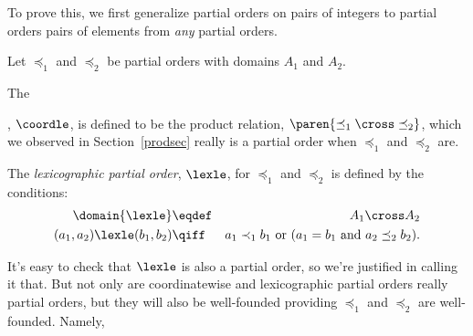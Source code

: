 \iffalse

But why stop at $n$ when we can be much more general without being any more
complicated?

The idea is that a Cartesion product, $A_1 \cross A_2 \cross \dots \cross
A_n$ of sets $A_1,A_2, \dots, A_n$ consists of all the $n$-tuples
$\ang{a_1,a_2,\dots,a_n}$ such that $a_i \in A_i$ for $1 \le i \le n$.  But
any such $n$-tuple can be represented by the function, $f$, where $f(i)
\eqdef a_i$.

GO ON TO DEFINE: a \emph{dependent-type} is a set-valued total function.
For example, for $r \in \reals$, define the dependent-type, $F_0$, by the
rule:
\[
F_0(r) \eqdef\ \ \set{t \in \reals \suchthat t \neq r}.
\]

If $F$ is a dependent-type, then an \emph{element of type, $F$,} is
defined to be a total function, $f$, with the same domain as $F$, and such
that
\[
\forall a \in \domain(F)\ f(a) \in F(a).
\]

AND SO ON...
\fi

To prove this, we first generalize partial orders on pairs of integers
to partial orders pairs of elements from \emph{any} partial orders.

\begin{definition}\label{lex-coord-def}
Let $\preceq_1$ and $\preceq_2$ be partial orders with domains $A_1$
and $A_2$.

The , $\coordle$, is defined to be the product relation,
$\paren{\preceq_1 \cross \preceq_2}$, which we observed in
Section~\ref{prodsec} really is a partial order when $\preceq_1$ and
$\preceq_2$ are.

The \emph{lexicographic partial order}, $\lexle$, for $\preceq_1$ and
$\preceq_2$ is defined by the conditions:
\begin{eqnarray*}
\domain{\lexle} &\eqdef& A_1 \cross A_2\\
(a_1,a_2) \lexle (b_1,b_2) & \qiff & a_1 \prec_1 b_1\text{ or } (a_1=b_1 \text{
and } a_2 \preceq_2 b_2).
\end{eqnarray*}

\end{definition}

It's easy to check that $\lexle$ is also a partial order, so we're
justified in calling it that.  But not only are coordinatewise and
lexicographic partial orders really partial orders, but they will also be
well-founded providing $\preceq_1$ and $\preceq_2$ are well-founded.
Namely,

